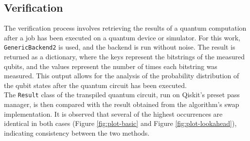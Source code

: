 \subsection{Verification} %
The verification process involves retrieving the results of a quantum computation after a job has been executed on a quantum device or simulator. For this work, \lstinline{GenericBackend2} \cite{ibmquantum_genericbackendv2} is used, and the backend is run without noise. The result is returned as a dictionary, where the keys represent the bitstrings of the measured qubits, and the values represent the number of times each bitstring was measured. This output allows for the analysis of the probability distribution of the qubit states after the quantum circuit has been executed. \\
The \lstinline{Result} class \cite{ibmquantum_result} of the transpiled quantum circuit, run on Qiskit's preset pass manager, is then compared with the result obtained from the algorithm's swap implementation. It is observed that several of the highest occurrences are identical in both cases (Figure \ref{fig:plot-basic} and Figure \ref{fig:plot-lookahead}), indicating consistency between the two methods.
